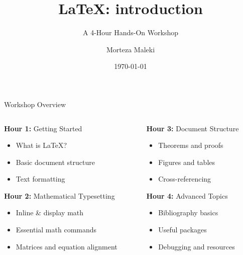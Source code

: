 \documentclass[ 9pt]{beamer}
\title{LaTeX: introduction}
\subtitle{A 4-Hour Hands-On Workshop}
\author{Morteza Maleki}
\institute{Tarbiat Modares University}
\date{\today}
\begin{document}
    
    \begin{frame}
        \titlepage
    \end{frame}
    
    \begin{frame}{Workshop Overview}
        \begin{columns}
            \begin{column}{0.5\textwidth}
                \textbf{Hour 1:} Getting Started
                \begin{itemize}
                    \item What is LaTeX?
                    \item Basic document structure
                    \item Text formatting
                \end{itemize}
                
                \textbf{Hour 2:} Mathematical Typesetting
                \begin{itemize}
                    \item Inline \& display math
                    \item Essential math commands
                    \item Matrices and equation alignment
                \end{itemize}
            \end{column}
            
            \begin{column}{0.5\textwidth}
                \textbf{Hour 3:} Document Structure
                \begin{itemize}
                    \item Theorems and proofs
                    \item Figures and tables
                    \item Cross-referencing
                \end{itemize}
                
                \textbf{Hour 4:} Advanced Topics
                \begin{itemize}
                    \item Bibliography basics
                    \item Useful packages
                    \item Debugging and resources
                \end{itemize}
            \end{column}
        \end{columns}
    \end{frame}
    
\end{document}
